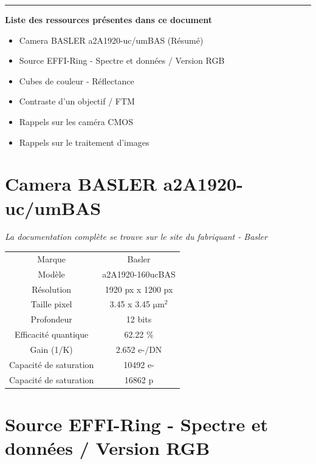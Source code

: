 \documentclass[a4paper,11pt,titlepage]{article} %
\begin{document}
\bigskip

\noindent \rule{\linewidth}{1pt}

\bigskip

\textbf{\large Liste des ressources présentes dans ce document}
\begin{itemize}
	\item Camera BASLER a2A1920-uc/umBAS (Résumé)
	\item Source EFFI-Ring - Spectre et données / Version RGB
	\item Cubes de couleur - Réflectance
	\item Contraste d'un objectif / FTM
	\item Rappels sur les caméra CMOS
	\item Rappels sur le traitement d'images
\end{itemize}


\newpage
\pagestyle{empty}

\strut %

\newpage
\pagestyle{empty}

\strut %

\section*{Camera BASLER a2A1920-uc/umBAS}

\textit{La documentation complète se trouve sur le site du fabriquant - Basler}

\begin{center}
\begin{tabular}{|c|c|}
	\hline
	Marque & Basler\\
	Modèle & a2A1920-160ucBAS\\
	\hline
	Résolution & 1920 px x 1200 px\\
	Taille pixel & 3.45 x 3.45 $\operatorname{\mu{}m^2}$\\
	Profondeur & 12 bits\\
	\hline
	Efficacité quantique & 62.22 \%\\
	Gain (1/K) & 2.652 e-/DN\\
	Capacité de saturation & 10492 e-\\
	Capacité de saturation & 16862 p	\\
	\hline
\end{tabular}
\end{center}


\section*{Source EFFI-Ring - Spectre et données / Version RGB}
\end{document}
